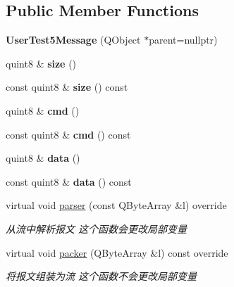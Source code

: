 \subsection*{Public Member Functions}
\begin{DoxyCompactItemize}
\item 
\mbox{\label{class_user_test5_message_a5f89f934b5d18e83216e1d0e9db0198f}} 
{\bfseries User\+Test5\+Message} (Q\+Object $\ast$parent=nullptr)
\item 
\mbox{\label{class_user_test5_message_aff583d8002300dbeda0b470ab216205e}} 
quint8 \& {\bfseries size} ()
\item 
\mbox{\label{class_user_test5_message_ae102bc640eb6fe3e3a69963e13c9995a}} 
const quint8 \& {\bfseries size} () const
\item 
\mbox{\label{class_user_test5_message_aa81f76b54c261e1fbc95514d73969c56}} 
quint8 \& {\bfseries cmd} ()
\item 
\mbox{\label{class_user_test5_message_a24a4b17deb69ba4afb97d0f09bbad115}} 
const quint8 \& {\bfseries cmd} () const
\item 
\mbox{\label{class_user_test5_message_a15078c5451f7ff2ee113650641772dfe}} 
quint8 \& {\bfseries data} ()
\item 
\mbox{\label{class_user_test5_message_acdc38a1b6746923b9d1b5e5256bf4142}} 
const quint8 \& {\bfseries data} () const
\item 
virtual void \mbox{\hyperlink{class_user_test5_message_ac73d80522b3e900250588f84ee69b25f}{parser}} (const Q\+Byte\+Array \&l) override
\begin{DoxyCompactList}\small\item\em 从流中解析报文 这个函数会更改局部变量 \end{DoxyCompactList}\item 
virtual void \mbox{\hyperlink{class_user_test5_message_abeaaf86a18f7483f616437ef51fd393c}{packer}} (Q\+Byte\+Array \&l) const override
\begin{DoxyCompactList}\small\item\em 将报文组装为流 这个函数不会更改局部变量 \end{DoxyCompactList}\end{DoxyCompactItemize}



